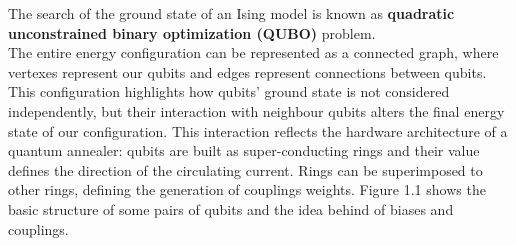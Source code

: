 The search of the ground state of an Ising model is known as \textbf{quadratic unconstrained binary optimization (QUBO)} problem. \\
The entire energy configuration can be represented as a connected graph, where vertexes represent our qubits and edges represent connections between qubits. This configuration highlights how qubits' ground state is not considered independently, but their interaction with neighbour qubits alters the final energy state of our configuration. This interaction reflects the hardware architecture of a quantum annealer: qubits are built as super-conducting rings and their value defines the direction of the circulating current. Rings can be superimposed to other rings, defining the generation of couplings weights. Figure 1.1 shows the basic structure of some pairs of qubits and the idea behind of biases and couplings. \\
